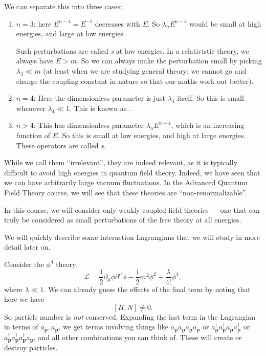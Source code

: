 \documentclass[a4paper]{article}
\begin{document}
We can separate this into three cases:
\begin{enumerate}
  \item $n = 3$: here $E^{n - 4} = E^{-1}$ decreases with $E$. So $\lambda_n E^{n - 4}$ would be small at high energies, and large at low energies.


    Such perturbations are called \emph{s} at low energies. In a relativistic theory, we always have $E > m$. So we can always make the perturbation small by picking $\lambda_3 \ll m$ (at least when we are studying general theory; we cannot go and change the coupling constant in nature so that our maths work out better).

  \item $n = 4$: Here the dimensionless parameter is just $\lambda_4$ itself. So this is small whenever $\lambda_4 \ll 1$. This is known as .

  \item $n > 4$: This has dimensionless parameter $\lambda_n E^{n - 4}$, which is an increasing function of $E$. So this is small at low energies, and high at large energies. These operators are called \emph{s}.
\end{enumerate}
While we call them ``irrelevant'', they are indeed relevant, as it is typically difficult to avoid high energies in quantum field theory. Indeed, we have seen that we can have arbitrarily large vacuum fluctuations. In the Advanced Quantum Field Theory course, we will see that these theories are ``non-renormalizable''.

In this course, we will consider only weakly coupled field theories --- one that can truly be considered as small perturbations of the free theory at all energies.

We will quickly describe some interaction Lagrangians that we will study in more detail later on.
\begin{eg}
  Consider the $\phi^4$ theory
  \[
    \mathcal{L} = \frac{1}{2} \partial_\mu \phi \partial^\mu \phi - \frac{1}{2}m^2 \phi^2 - \frac{\lambda}{4!}\phi^4,
  \]
  where $\lambda \ll 1$. We can already guess the effects of the final term by noting that here we have
  \[
    [H, N] \not= 0.
  \]
  So particle number is \emph{not} conserved. Expanding the last term in the Lagrangian in terms of $a_\mathbf{p}, a_\mathbf{p}^\dagger$, we get terms involving things like $a_\mathbf{p} a_\mathbf{p} a_\mathbf{p} a_\mathbf{p}$ or $a_\mathbf{p}^\dagger a_\mathbf{p}^\dagger a_\mathbf{p}^\dagger a_\mathbf{p}^\dagger$ or $a_\mathbf{p}^\dagger a_\mathbf{p}^\dagger a_\mathbf{p}^\dagger a_\mathbf{p}$, and all other combinations you can think of. These will create or destroy particles.
\end{eg}
\end{document}
